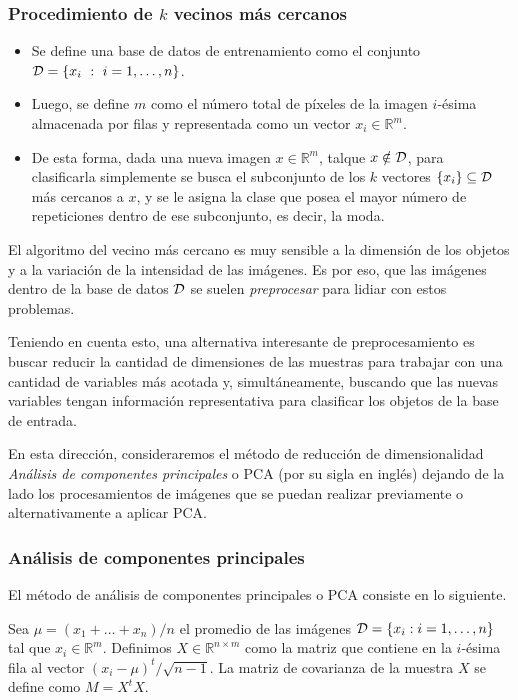 \documentclass[11pt, a4paper]{article}
\newcommand{\real}{\mathbb{R}}
\begin{document}
\subsubsection*{Procedimiento de $k$ vecinos más cercanos}
\begin{itemize}
 \item Se define una base de datos de entrenamiento como el conjunto ${\cal D} = \{ x_i \ : \ i = 1,\dots,n\}$.
 \item Luego, se define $m$ como el número total de píxeles de la imagen $i$-ésima almacenada por filas y representada como un vector $x_i \in \real^{m}$.
 \item De esta forma, dada una nueva imagen $x \in \real^{m}$, talque $x \notin {\cal D}$, 
 para clasificarla simplemente se busca el subconjunto de los $k$ vectores $\{x_i\} \subseteq {\cal D}$ más cercanos a $x$, y se le asigna la clase que posea el mayor número de repeticiones dentro de ese subconjunto, es decir, la moda.
\end{itemize}

El algoritmo del vecino más cercano es muy sensible a la dimensión de los objetos y a la variación de la intensidad de las imágenes.
%
Es por eso, que las imágenes dentro de la base de datos ${\cal D}$ se suelen \textit{preprocesar} para lidiar con estos problemas.

Teniendo en cuenta esto, una alternativa interesante de preprocesamiento es buscar reducir la cantidad de dimensiones de las muestras para trabajar con una cantidad de variables más acotada y, simultáneamente, buscando que las nuevas variables tengan información representativa para clasificar los objetos de la base de entrada. 

En esta dirección, consideraremos el método de reducción de dimensionalidad \emph{Análisis de componentes principales} o PCA (por su sigla en inglés) dejando de la lado los procesamientos de imágenes que se puedan realizar previamente o alternativamente a aplicar PCA.


\subsubsection*{Análisis de componentes principales}

El método de análisis de componentes principales o PCA consiste en lo siguiente.


Sea $\mu = (x_1 + \ldots + x_n)/n$ el promedio de las imágenes ${\cal D} = \{x_i : i = 1, \dots, n \}$ tal que $x_i \in \real^m$.
%
Definimos $X\in\real^{n\times m}$ como la matriz que contiene en la $i$-ésima fila al vector $(x_i - \mu)^{t}/\sqrt{n-1}$.
La matriz de covarianza de la muestra $X$ se define como $M=X^tX$.
\end{document}

